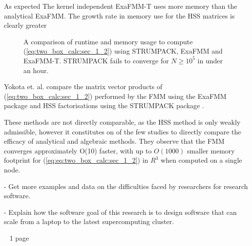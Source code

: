 As expected The kernel independent ExaFMM-T uses more memory than the analytical ExaFMM. The growth rate in memory use for the HSS matrices is clearly greater 

\begin{figure}%
    \centering
    \qquad
    \caption{A comparison of runtime and memory usage to compute (\ref{eq:two_box_calc:sec_1_2}) using STRUMPACK, ExaFMM and ExaFMM-T.  STRUMPACK fails to converge for $N \geq 10^5$ in under an hour.}
    \label{fig:sec_2_0:software_comparison}%
\end{figure}

Yokota et. al. compare the matrix vector products of (\ref{eq:two_box_calc:sec_1_2}) performed by the \gls{FMM} using the ExaFMM package \cite{exafmm} and HSS factorisations using the STRUMPACK package \cite{rouet2016distributed}. 

These methods are not directly comparable, as the HSS method is only weakly admissible, however it constitutes on of the few studies to directly compare the efficacy of analytical and algebraic methods. They observe that the FMM converges approximately O(10) faster, with up to $O(1000)$ smaller memory footprint for (\ref{eq:eq:two_box_calc:sec_1_2}) in $R^3$ when computed on a single node.

- Get more examples and data on the difficulties faced by researchers for research software.

- Explain how the software goal of this research is to design software that can scale from a laptop to the latest supercomputing cluster.

~ 1 page